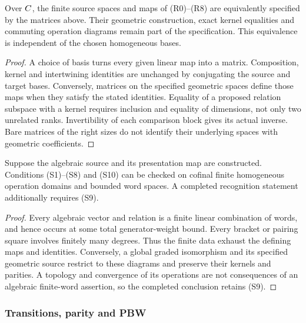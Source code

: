\begin{proposition}
\label{prop:finite-source-proof-tables-equivalence}
Over $C$, the finite source spaces and maps of (R0)--(R8) are
equivalently specified by the matrices above. Their geometric
construction, exact kernel equalities and commuting operation
diagrams remain part of the specification. This equivalence is independent of the chosen
homogeneous bases.
\end{proposition}
\begin{proof}
A choice of basis turns every given linear map into a matrix.
Composition, kernel and intertwining identities are unchanged by
conjugating the source and target bases. Conversely, matrices on
the specified geometric spaces define those maps when they satisfy
the stated identities. Equality of a proposed relation subspace
with a kernel requires inclusion and equality of dimensions, not
only two unrelated ranks. Invertibility of each comparison block
gives its actual inverse. Bare matrices of the right sizes do not
identify their underlying spaces with geometric coefficients.
\end{proof}

\begin{proposition}
\label{prop:global-recognition-cofinal-datum}
Suppose the algebraic source and its presentation map are
constructed. Conditions (S1)--(S8) and (S10) can be checked on
cofinal finite homogeneous operation domains and bounded word spaces.
A completed recognition statement additionally requires (S9).
\end{proposition}
\begin{proof}
Every algebraic vector and relation is a finite linear combination
of words, and hence occurs at some total generator-weight bound.
Every bracket or pairing square involves finitely many degrees.
Thus the finite data exhaust the defining maps and identities.
Conversely, a global graded isomorphism and its specified geometric
source restrict to these diagrams and preserve their kernels and
parities. A topology and convergence of its operations are not
consequences of an algebraic finite-word assertion, so the completed
conclusion retains (S9).
\end{proof}

\subsubsection*{Transitions, parity and PBW}

